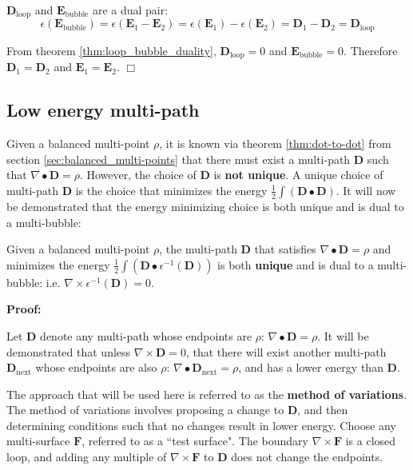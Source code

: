 \(\mathbf{D}_{\text{loop}}\) and \(\mathbf{E}_{\text{bubble}}\) are a dual pair:
\[\epsilon(\mathbf{E}_{\text{bubble}}) = \epsilon(\mathbf{E}_1 - \mathbf{E}_2) = \epsilon(\mathbf{E}_1) - \epsilon(\mathbf{E}_2) = \mathbf{D}_1 - \mathbf{D}_2 = \mathbf{D}_{\text{loop}}\]

From theorem \ref{thm:loop_bubble_duality}, \(\mathbf{D}_{\text{loop}} = 0\) and \(\mathbf{E}_{\text{bubble}} = 0\). Therefore \(\mathbf{D}_1 = \mathbf{D}_2\) and \(\mathbf{E}_1 = \mathbf{E}_2\). \(\Box\)



\subsection{Low energy multi-path}

Given a balanced multi-point \(\rho\), it is known via theorem \ref{thm:dot-to-dot} from section \ref{sec:balanced_multi-points} that there must exist a multi-path \(\mathbf{D}\) such that \(\nabla \bullet \mathbf{D} = \rho\). However, the choice of \(\mathbf{D}\) is {\bf not unique}. A unique choice of multi-path \(\mathbf{D}\) is the choice that minimizes the energy \(\frac{1}{2}\int (\mathbf{D} \bullet \mathbf{D})\). It will now be demonstrated that the energy minimizing choice is both unique and is dual to a multi-bubble:

\begin{thm}\label{thm:low_energy_path}
Given a balanced multi-point \(\rho\), the multi-path \(\mathbf{D}\) that satisfies \(\nabla \bullet \mathbf{D} = \rho\) and minimizes the energy \(\frac{1}{2}\int (\mathbf{D} \bullet \epsilon^{-1}(\mathbf{D}))\) is both {\bf unique} and is dual to a multi-bubble: i.e. \(\nabla \times \epsilon^{-1}(\mathbf{D}) = 0\). 
\end{thm}
\textbf{Proof:}

Let \(\mathbf{D}\) denote any multi-path whose endpoints are \(\rho\): \(\nabla \bullet \mathbf{D} = \rho\). It will be demonstrated that unless \(\nabla \times \mathbf{D} = 0\), that there will exist another multi-path \(\mathbf{D}_{\text{next}}\) whose endpoints are also \(\rho\): \(\nabla \bullet \mathbf{D}_{\text{next}} = \rho\), and has a lower energy than \(\mathbf{D}\). 

The approach that will be used here is referred to as the {\bf method of variations}. The method of variations involves proposing a change to \(\mathbf{D}\), and then determining conditions such that no changes result in lower energy. Choose any multi-surface \(\mathbf{F}\), referred to as a ``test surface". The boundary \(\nabla \times \mathbf{F}\) is a closed loop, and adding any multiple of \(\nabla \times \mathbf{F}\) to \(\mathbf{D}\) does not change the endpoints.

